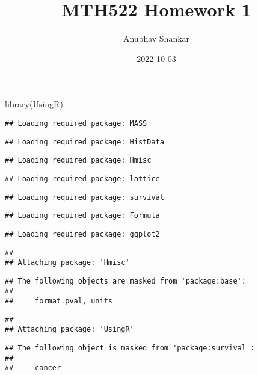 \documentclass[
]{article}
\title{MTH522 Homework 1}
\author{Anubhav Shankar}
\date{2022-10-03}
\newenvironment{Shaded}{\begin{snugshade}}{\end{snugshade}}
\newcommand{\FunctionTok}[1]{\textcolor[rgb]{0.00,0.00,0.00}{#1}}
\newcommand{\NormalTok}[1]{#1}
\begin{document}
\maketitle

\begin{Shaded}
\begin{Highlighting}[]
\FunctionTok{library}\NormalTok{(UsingR)}
\end{Highlighting}
\end{Shaded}

\begin{verbatim}
## Loading required package: MASS
\end{verbatim}

\begin{verbatim}
## Loading required package: HistData
\end{verbatim}

\begin{verbatim}
## Loading required package: Hmisc
\end{verbatim}

\begin{verbatim}
## Loading required package: lattice
\end{verbatim}

\begin{verbatim}
## Loading required package: survival
\end{verbatim}

\begin{verbatim}
## Loading required package: Formula
\end{verbatim}

\begin{verbatim}
## Loading required package: ggplot2
\end{verbatim}

\begin{verbatim}
## 
## Attaching package: 'Hmisc'
\end{verbatim}

\begin{verbatim}
## The following objects are masked from 'package:base':
## 
##     format.pval, units
\end{verbatim}

\begin{verbatim}
## 
## Attaching package: 'UsingR'
\end{verbatim}

\begin{verbatim}
## The following object is masked from 'package:survival':
## 
##     cancer
\end{verbatim}
\end{document}
